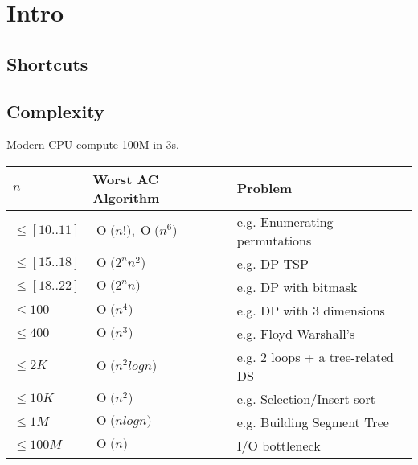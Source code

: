 \documentclass[twocolumn,8pt]{article}
\newcommand{\BigO}[1]{\ensuremath{\operatorname{O}\bigl(#1\bigr)}}
\begin{document}

\thispagestyle{tcr}
\pagestyle{tcr}

\makeatletter
{}
\makeatother

\section{Intro}

\subsection{Shortcuts}



\subsection{Complexity}

Modern CPU compute 100M in 3s.

\begin{center}
    \begin{tabular}{ l l p{5cm}}
    \hline
    $n$             &   Worst AC Algorithm              & Problem \\ \hline
    $\leq [10..11]$ &   $\BigO{n!}, \BigO{n^6}$        & e.g. Enumerating permutations \\
    $\leq [15..18]$ &   $\BigO{2^n n^2} $              & e.g. DP TSP\\
    $\leq [18..22]$ &   $\BigO{2^n n} $                & e.g. DP with bitmask \\
    $\leq 100$      &   $\BigO{n^4} $                  & e.g. DP with 3 dimensions \\
    $\leq 400$      &   $\BigO{n^3} $                  & e.g. Floyd Warshall's \\
    $\leq 2K$       &   $\BigO{n^2 log n} $            & e.g. 2 loops + a tree-related DS \\
    $\leq 10K$      &   $\BigO{n^2} $                  & e.g. Selection/Insert sort \\
    $\leq 1M$       &   $\BigO{n log n} $              & e.g. Building Segment Tree  \\
    $\leq 100M$     &   $\BigO{n} $                    & I/O bottleneck \\
    \end{tabular}
\end{center}
\end{document}
